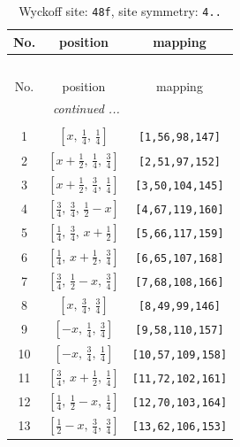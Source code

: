 \documentclass[fleqn,8pt]{jsarticle}
\begin{document}
\begin{longtable}{ccc}
\caption{Wyckoff site: {\tt 48f}, site symmetry: {\tt 4..}}
 \\
 \hline \hline
No. & position & mapping \\ \hline \endfirsthead

\multicolumn{2}{l}{\tablename\ \thetable{}} \\
 \hline \hline
No. & position & mapping \\ \hline \endhead

 \hline \hline
\multicolumn{2}{r}{\footnotesize\it continued ...} \\ \endfoot

 \hline \hline
\multicolumn{2}{r}{} \\ \endlastfoot

1 & $\left[ x,\, \frac{1}{4},\, \frac{1}{4} \right]$ & {\tt [1,56,98,147]} \\ \hline
2 & $\left[ x + \frac{1}{2},\, \frac{1}{4},\, \frac{3}{4} \right]$ & {\tt [2,51,97,152]} \\ \hline
3 & $\left[ x + \frac{1}{2},\, \frac{3}{4},\, \frac{1}{4} \right]$ & {\tt [3,50,104,145]} \\ \hline
4 & $\left[ \frac{3}{4},\, \frac{3}{4},\, \frac{1}{2} - x \right]$ & {\tt [4,67,119,160]} \\ \hline
5 & $\left[ \frac{1}{4},\, \frac{3}{4},\, x + \frac{1}{2} \right]$ & {\tt [5,66,117,159]} \\ \hline
6 & $\left[ \frac{1}{4},\, x + \frac{1}{2},\, \frac{3}{4} \right]$ & {\tt [6,65,107,168]} \\ \hline
7 & $\left[ \frac{3}{4},\, \frac{1}{2} - x,\, \frac{3}{4} \right]$ & {\tt [7,68,108,166]} \\ \hline
8 & $\left[ x,\, \frac{3}{4},\, \frac{3}{4} \right]$ & {\tt [8,49,99,146]} \\ \hline
9 & $\left[ - x,\, \frac{1}{4},\, \frac{3}{4} \right]$ & {\tt [9,58,110,157]} \\ \hline
10 & $\left[ - x,\, \frac{3}{4},\, \frac{1}{4} \right]$ & {\tt [10,57,109,158]} \\ \hline
11 & $\left[ \frac{3}{4},\, x + \frac{1}{2},\, \frac{1}{4} \right]$ & {\tt [11,72,102,161]} \\ \hline
12 & $\left[ \frac{1}{4},\, \frac{1}{2} - x,\, \frac{1}{4} \right]$ & {\tt [12,70,103,164]} \\ \hline
13 & $\left[ \frac{1}{2} - x,\, \frac{3}{4},\, \frac{3}{4} \right]$ & {\tt [13,62,106,153]} \\ \hline

\end{longtable}
\end{document}
